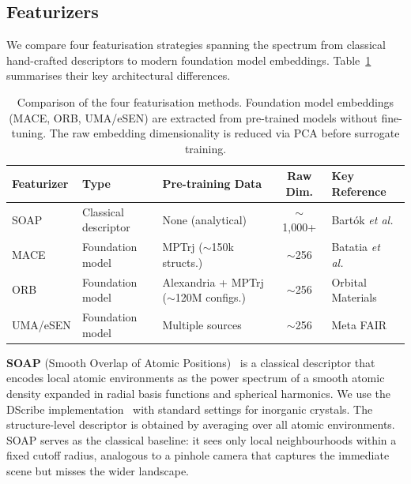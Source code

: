 \subsection{Featurizers}
\label{sec:featurizers}

We compare four featurisation strategies spanning the spectrum from classical hand-crafted descriptors to modern foundation model embeddings.
Table~\ref{tab:featurizers} summarises their key architectural differences.

\begin{table}[!htb]
    \centering
    \caption{Comparison of the four featurisation methods. Foundation model embeddings (MACE, ORB, UMA/eSEN) are extracted from pre-trained models without fine-tuning. The raw embedding dimensionality is reduced via PCA before surrogate training.}
    \label{tab:featurizers}
    \small
    \begin{tabular}{@{}lllcl@{}}
        \toprule
        \textbf{Featurizer} & \textbf{Type} & \textbf{Pre-training Data} & \textbf{Raw Dim.} & \textbf{Key Reference} \\
        \midrule
        SOAP & Classical descriptor & None (analytical) & $\sim$1{,}000+ & Bart{\'o}k \emph{et al.}~\cite{bartok2013representing} \\
        MACE & Foundation model & MPTrj ($\sim$150k structs.) & $\sim$256 & Batatia \emph{et al.}~\cite{batatia2022mace,batatia2024foundation} \\
        ORB & Foundation model & Alexandria + MPTrj ($\sim$120M configs.) & $\sim$256 & Orbital Materials~\cite{orb2024} \\
        UMA/eSEN & Foundation model & Multiple sources & $\sim$256 & Meta FAIR~\cite{uma2025} \\
        \bottomrule
    \end{tabular}
\end{table}

\textbf{SOAP} (Smooth Overlap of Atomic Positions)~\cite{bartok2013representing} is a classical descriptor that encodes local atomic environments as the power spectrum of a smooth atomic density expanded in radial basis functions and spherical harmonics.
We use the DScribe implementation~\cite{dscribe2020} with standard settings for inorganic crystals.
The structure-level descriptor is obtained by averaging over all atomic environments.
SOAP serves as the classical baseline: it sees only local neighbourhoods within a fixed cutoff radius, analogous to a pinhole camera that captures the immediate scene but misses the wider landscape.

